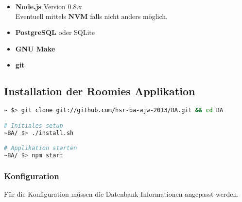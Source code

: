 \begin{itemize}
	\item \textbf{Node.js} Version 0.8.x \cite{nodejs}\\
		Eventuell mittels \textbf{NVM} \cite{NVM} falls nicht anders möglich.
	\item \textbf{PostgreSQL} \cite{PostgreSQL} oder SQLite \cite{SQLite}
	\item \textbf{GNU Make} \cite{GNUmake}
	\item \textbf{git} \cite{git}
\end{itemize}

\subsection*{Installation der Roomies Applikation}

\begin{lstlisting}[language=Bash, caption=Installationsanleitung ohne Vagrant]
~ $> git clone git://github.com/hsr-ba-ajw-2013/BA.git && cd BA

# Initiales setup
~BA/ $> ./install.sh

# Applikation starten
~BA/ $> npm start
\end{lstlisting}

\subsubsection*{Konfiguration}
Für die Konfiguration müssen die Datenbank-Informationen angepasst werden.